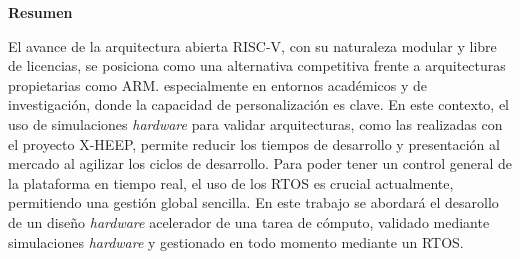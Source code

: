 \thispagestyle{empty}

\parindent=16mm

\vspace*{2cm}

\begin{flushleft}
  \begin{Large}
    \textbf{Resumen}\\
  \end{Large}
  \masterRule
\end{flushleft}

\vspace*{1cm}

El avance de la arquitectura abierta RISC-V, con su naturaleza modular y libre de licencias, se posiciona como una alternativa competitiva frente a arquitecturas propietarias como ARM. especialmente en entornos académicos y de investigación, donde la capacidad de personalización es clave. En este contexto, el uso de simulaciones \textit{hardware} para validar arquitecturas, como las realizadas con el proyecto X-HEEP, permite reducir los tiempos de desarrollo y presentación al mercado al agilizar los ciclos de desarrollo. Para poder tener un control general de la plataforma en tiempo real, el uso de los RTOS es crucial actualmente, permitiendo una gestión global sencilla. En este trabajo se abordará el desarollo de un diseño \textit{hardware} acelerador de una tarea de cómputo, validado mediante simulaciones \textit{hardware} y gestionado en todo momento mediante un RTOS.